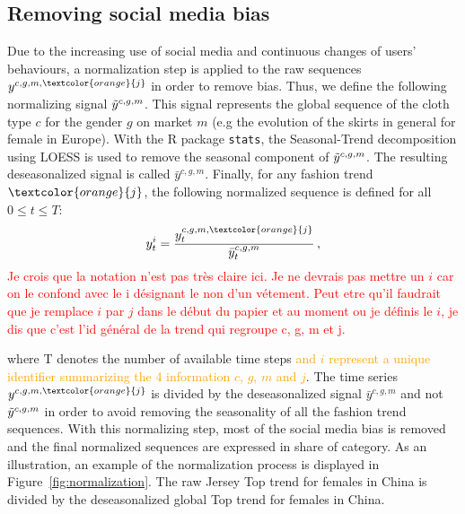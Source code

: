 \documentclass[10pt]{article} %
\begin{document}
\subsection{Removing social media bias}
\label{sec:dataset:b}

Due to the increasing use of social media and continuous changes of users' behaviours, a normalization step is applied to the raw sequences $y^{c,g,m,\textcolor{orange}{j}}$ in order to remove bias. Thus, we define the following normalizing signal $\Tilde{y}^{c,g,m}$. This signal represents the global sequence of the cloth type $c$ for the gender $g$ on market $m$ (e.g the evolution of the skirts in general for female in Europe). With the R package \texttt{stats}, the Seasonal-Trend decomposition using LOESS  \citep{cleveland1990} is used to remove the seasonal component of $\Tilde{y}^{c,g,m}$. The resulting deseasonalized signal is called  $\bar{y}^{c,g,m}$. Finally, for any fashion trend $\textcolor{orange}{j}$, the following normalized sequence is defined for all $ 0 \leq t \leq T$:
\begin{equation}
    y^{i}_t = \frac{y^{c,g,m,\textcolor{orange}{j}}_{t}}{\bar{y}^{c,g,m}_t}\,,
\end{equation}
\textcolor{red}{Je crois que la notation n'est pas très claire ici. Je ne devrais pas mettre un $i$ car on le confond avec le i désignant le non d'un vétement. Peut etre qu'il faudrait que je remplace $i$ par $j$ dans le début du papier et au moment ou je définis le $i$, je dis que c'est l'id général de la trend qui regroupe c, g, m et j.}

where T denotes the number of available time steps \textcolor{orange}{and $i$ represent a unique identifier summarizing the 4 information $c$, $g$, $m$ and $j$}. The time series $y^{c,g,m,\textcolor{orange}{j}}$ is divided by the deseasonalized signal $\bar{y}^{c,g,m}$ and not $\Tilde{y}^{c,g,m}$ in order to avoid removing the seasonality of all the fashion trend sequences. With this normalizing step, most of the social media bias is removed and the final normalized sequences are expressed in share of category. As an illustration, an example of the normalization process is displayed in Figure~\ref{fig:normalization}. The raw Jersey Top trend for females in China is divided by the deseasonalized global Top trend for females in China. 
\end{document}
